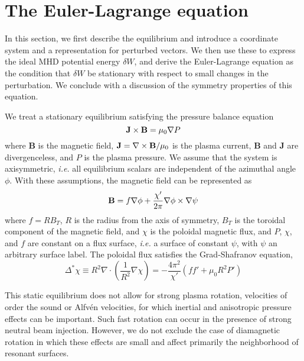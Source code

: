\documentclass[prb,twocolumn,showpacs,preprintnumbers,amsmath,amssymb]{revtex4}
\renewcommand*{\v}[1]{\hbox{\bfseries #1}}
\begin{document}
\section{\label{sec:euler}The Euler-Lagrange equation}

In this section, we first describe the equilibrium and introduce a
coordinate system and a representation for perturbed vectors.  We then
use these to express the ideal MHD potential energy $\delta W$, and
derive the Euler-Lagrange equation as the condition that $\delta W$ be
stationary with respect to small changes in the perturbation.  We
conclude with a discussion of the symmetry properties of this equation.

We treat a stationary equilibrium\cite{mdk58} satisfying the pressure
balance equation
\[
\v{J} \times \v{B} = \mu_0 \nabla P
\]
where \v{B} is the magnetic field, $\v{J} = \nabla \times \v{B}/\mu_0$
is the plasma current, \v{B} and \v{J} are divergenceless, and $P$ is
the plasma pressure.  We assume that the system is axisymmetric,
\textit{i.e.}  all equilibrium scalars are independent of the azimuthal
angle $\phi$.  With these assumptions, the magnetic field can be
represented as
\[
\v{B} = f \nabla \phi + \frac{\chi'}{2 \pi} \nabla \phi \times \nabla \psi
\]
where $f = R B_T$, $R$ is the radius from the axis of symmetry, $B_T$ is
the toroidal component of the magnetic field, and $\chi$ is the poloidal
magnetic flux, and $P$, $\chi$, and $f$ are constant on a flux surface,
{\it i.e.} a surface of constant $\psi$, with $\psi$ an arbitrary
surface label.  The poloidal flux satisfies the Grad-Shafranov equation,
\[
\Delta^* \chi 
	\equiv R^2 \nabla \cdot \left( \frac{1}{R^2} \nabla \chi \right)
	= - \frac{4 \pi^2}{\chi'} (ff' + \mu_0 R^2 P')
\]

This static equilibrium does not allow for strong plasma rotation,
velocities of order the sound or Alfv\'en velocities, for which inertial
and anisotropic pressure effects can be important.  Such fast rotation
can occur in the presence of strong neutral beam injection.  However, we
do not exclude the case of diamagnetic rotation in which these effects
are small and affect primarily the neighborhood of resonant surfaces.
\end{document}
